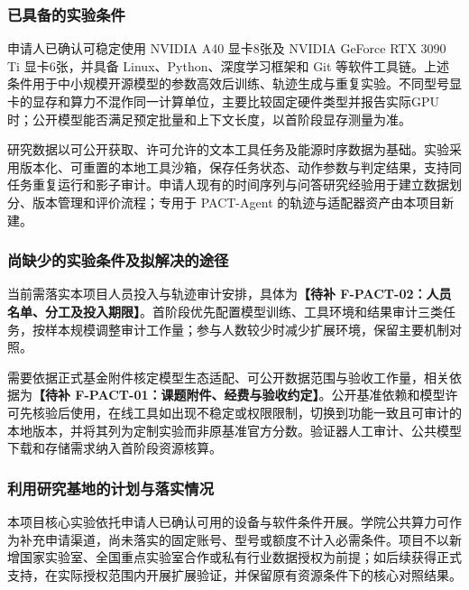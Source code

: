 \justifying
\NSFCBodyText

\subsubsection{已具备的实验条件}

申请人已确认可稳定使用 NVIDIA A40 显卡8张及 NVIDIA GeForce RTX 3090 Ti 显卡6张，并具备 Linux、Python、深度学习框架和 Git 等软件工具链。上述条件用于中小规模开源模型的参数高效后训练、轨迹生成与重复实验。不同型号显卡的显存和算力不混作同一计算单位，主要比较固定硬件类型并报告实际GPU时；公开模型能否满足预定批量和上下文长度，以首阶段显存测量为准。

研究数据以可公开获取、许可允许的文本工具任务及能源时序数据为基础。实验采用版本化、可重置的本地工具沙箱，保存任务状态、动作参数与判定结果，支持同任务重复运行和影子审计。申请人现有的时间序列与问答研究经验用于建立数据划分、版本管理和评价流程；专用于 PACT-Agent 的轨迹与适配器资产由本项目新建。

\subsubsection{尚缺少的实验条件及拟解决的途径}

当前需落实本项目人员投入与轨迹审计安排，具体为\textbf{【待补 F-PACT-02：人员名单、分工及投入期限】}。首阶段优先配置模型训练、工具环境和结果审计三类任务，按样本规模调整审计工作量；参与人数较少时减少扩展环境，保留主要机制对照。

需要依据正式基金附件核定模型生态适配、可公开数据范围与验收工作量，相关依据为\textbf{【待补 F-PACT-01：课题附件、经费与验收约定】}。公开基准依赖和模型许可先核验后使用，在线工具如出现不稳定或权限限制，切换到功能一致且可审计的本地版本，并将其列为定制实验而非原基准官方分数。验证器人工审计、公共模型下载和存储需求纳入首阶段资源核算。

\subsubsection{利用研究基地的计划与落实情况}

本项目核心实验依托申请人已确认可用的设备与软件条件开展。学院公共算力可作为补充申请渠道，尚未落实的固定账号、型号或额度不计入必需条件。项目不以新增国家实验室、全国重点实验室合作或私有行业数据授权为前提；如后续获得正式支持，在实际授权范围内开展扩展验证，并保留原有资源条件下的核心对照结果。
